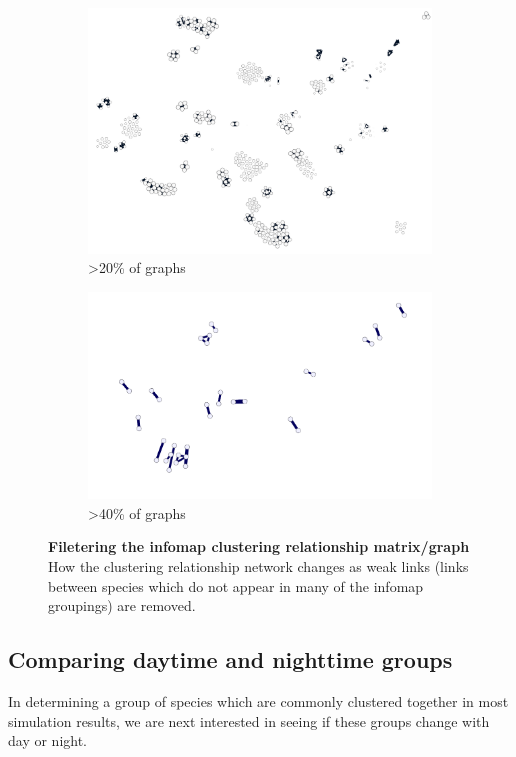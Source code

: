 \begin{figure}[H]
\begin{subfigure}[t]{.5\textwidth}
  \centering
  \includegraphics[width=\textwidth]{fig/c3.png}
  \caption{>20\% of graphs}
\end{subfigure}%
\begin{subfigure}[t]{.5\textwidth}
  \centering
  \includegraphics[width=\textwidth]{fig/c4.png}
  \caption{>40\% of graphs}
\end{subfigure}%
\caption{\textbf{Filetering the infomap clustering relationship matrix/graph} How the clustering relationship network changes as weak links (links between species which do not appear in many of the infomap groupings) are removed. }
\label{fig:infomapprune}
\end{figure}

\subsection{Comparing daytime and nighttime groups}
In determining a group of species which are commonly clustered together in most simulation results, we are next interested in seeing if these groups change with day or night.

